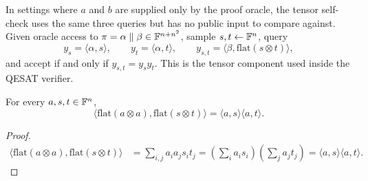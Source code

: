 \begin{definition}\label{TENSORQ.selfVerifier}\leanok
In settings where \(a\) and \(b\) are supplied only by the proof oracle, the tensor self-check uses the same three
queries but has no public input to compare against. Given oracle access to
\(\pi=\alpha\parallel\beta\in\mathbb{F}^{n+n^2}\), sample \(s,t\leftarrow\mathbb{F}^n\), query
\[
  y_s=\langle\alpha,s\rangle,\qquad
  y_t=\langle\alpha,t\rangle,\qquad
  y_{s,t}=\langle\beta,\mathrm{flat}(s\otimes t)\rangle,
\]
and accept if and only if \(y_{s,t}=y_s y_t\). This is the tensor component used inside the QESAT verifier.
\end{definition}

\begin{lemma}\label{TENSORQ.tensor_check_complete}\leanok
For every \(a,s,t\in\mathbb{F}^n\),
\[
  \langle \mathrm{flat}(a\otimes a),\mathrm{flat}(s\otimes t)\rangle
  = \langle a,s\rangle \langle a,t\rangle.
\]
\end{lemma}
\begin{proof}\leanok
\begin{align*}
  \langle \mathrm{flat}(a\otimes a),\mathrm{flat}(s\otimes t)\rangle
    &= \sum_{i,j} a_i a_j s_i t_j
     = \left(\sum_i a_i s_i\right)\left(\sum_j a_j t_j\right)
     = \langle a,s\rangle \langle a,t\rangle.
\end{align*}
\end{proof}


